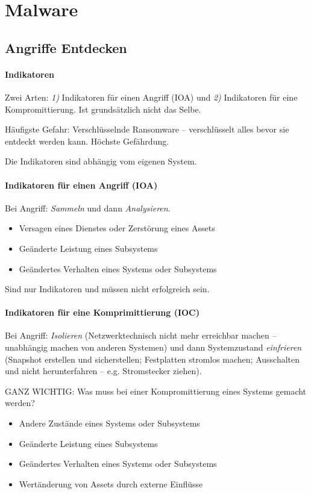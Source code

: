 \documentclass[a4paper,12pt]{article}
\begin{document}
\newpage
\section{Malware}

\subsection{Angriffe Entdecken}

\paragraph{Indikatoren} Zwei Arten: \emph{1)} Indikatoren für einen Angriff (IOA) und \emph{2)} Indikatoren für eine Kompromittierung.
Ist grundsätzlich nicht das Selbe.

Häufigste Gefahr: Verschlüsselnde Ransomware -- verschlüsselt alles bevor sie entdeckt werden kann. Höchste Gefährdung. 

Die Indikatoren sind abhängig vom eigenen System. 

\paragraph{Indikatoren für einen Angriff (IOA)}
Bei Angriff: \emph{Sammeln} und dann \emph{Analysieren}.

\begin{itemize}
\item Versagen eines Dienstes oder Zerstörung eines Assets
\item Geänderte Leistung eines Subsystems
\item Geändertes Verhalten eines Systems oder Subsystems
\end{itemize}

Sind nur Indikatoren und müssen nicht erfolgreich sein.

\paragraph{Indikatoren für eine Komprimittierung (IOC)}
Bei Angriff: \emph{Isolieren} (Netzwerktechnisch nicht mehr erreichbar machen -- unabhängig machen von anderen Systemen) und dann Systemzustand \emph{einfrieren} (Snapshot erstellen und sicherstellen; Festplatten stromlos machen; Ausschalten und nicht herunterfahren -- e.g. Stromstecker ziehen).

GANZ WICHTIG: Was muss bei einer Kompromittierung eines Systems gemacht werden?

\begin{itemize}
\item Andere Zustände eines Systems oder Subsystems
\item Geänderte Leistung eines Subsystems
\item Geändertes Verhalten eines Systems oder Subsystems
\item Wertänderung von Assets durch externe Einflüsse
\end{itemize}
\end{document}
